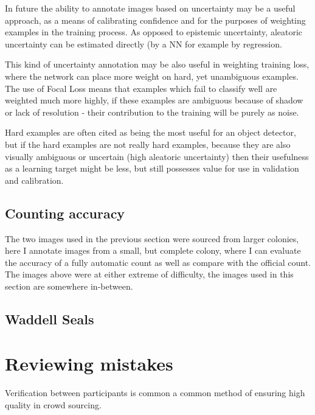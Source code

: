 In future the ability to annotate images based on uncertainty may be a useful approach, as a means of calibrating confidence and for the purposes of weighting examples in the training process. As opposed to epistemic uncertainty, aleatoric uncertainty can be estimated directly (by a \gls{NN} for example by regression.  

This kind of uncertainty annotation may be also useful in weighting training loss, where the network can place more weight on hard, yet unambiguous examples. The use of Focal Loss means that examples which fail to classify well are weighted much more highly, if these examples are ambiguous because of shadow or lack of resolution - their contribution to the training will be purely as noise.

Hard examples are often cited as being the most useful for an object detector, but if the hard examples are not really hard examples, because they are also visually ambiguous or uncertain (high aleatoric uncertainty) then their usefulness as a learning target might be less, but still possesses value for use in validation and calibration.


\subsection{Counting accuracy}

The two images used in the previous section were sourced from larger colonies, here I annotate images from a small, but complete colony, where I can evaluate the accuracy of a fully automatic count as well as compare with the official count. The images above were at either extreme of difficulty, the images used in this section are somewhere in-between. 



\subsection{Waddell Seals}




\section {Reviewing mistakes}

Verification between participants is common a common method of ensuring high quality in crowd sourcing.

